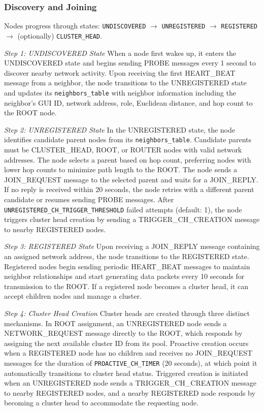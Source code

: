 \documentclass[conference]{IEEEtran}
\begin{document}
\subsubsection{Discovery and Joining}
Nodes progress through states: \texttt{UNDISCOVERED} $\rightarrow$ \texttt{UNREGISTERED} $\rightarrow$ \texttt{REGISTERED} $\rightarrow$ (optionally) \texttt{CLUSTER\_HEAD}.

\emph{Step 1: UNDISCOVERED State}
When a node first wakes up, it enters the UNDISCOVERED state and begins sending PROBE messages every 1 second to discover nearby network activity. Upon receiving the first HEART\_BEAT message from a neighbor, the node transitions to the UNREGISTERED state and updates its \texttt{neighbors\_table} with neighbor information including the neighbor's GUI ID, network address, role, Euclidean distance, and hop count to the ROOT node.

\emph{Step 2: UNREGISTERED State}
In the UNREGISTERED state, the node identifies candidate parent nodes from its \texttt{neighbors\_table}. Candidate parents must be CLUSTER\_HEAD, ROOT, or ROUTER nodes with valid network addresses. The node selects a parent based on hop count, preferring nodes with lower hop counts to minimize path length to the ROOT. The node sends a JOIN\_REQUEST message to the selected parent and waits for a JOIN\_REPLY. If no reply is received within 20 seconds, the node retries with a different parent candidate or resumes sending PROBE messages. After \texttt{UNREGISTERED\_CH\_TRIGGER\_THRESHOLD} failed attempts (default: 1), the node triggers cluster head creation by sending a TRIGGER\_CH\_CREATION message to nearby REGISTERED nodes.

\emph{Step 3: REGISTERED State}
Upon receiving a JOIN\_REPLY message containing an assigned network address, the node transitions to the REGISTERED state. Registered nodes begin sending periodic HEART\_BEAT messages to maintain neighbor relationships and start generating data packets every 10 seconds for transmission to the ROOT. If a registered node becomes a cluster head, it can accept children nodes and manage a cluster.

\emph{Step 4: Cluster Head Creation}
Cluster heads are created through three distinct mechanisms. In ROOT assignment, an UNREGISTERED node sends a NETWORK\_REQUEST message directly to the ROOT, which responds by assigning the next available cluster ID from its pool. Proactive creation occurs when a REGISTERED node has no children and receives no JOIN\_REQUEST messages for the duration of \texttt{PROACTIVE\_CH\_TIMER} (20 seconds), at which point it automatically transitions to cluster head status. Triggered creation is initiated when an UNREGISTERED node sends a TRIGGER\_CH\_CREATION message to nearby REGISTERED nodes, and a nearby REGISTERED node responds by becoming a cluster head to accommodate the requesting node.
\end{document}
